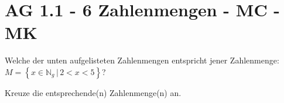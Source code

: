 \section{AG 1.1 - 6 Zahlenmengen - MC - MK}

\begin{beispiel}[AG 1.1]{1} %
				Welche der unten aufgelisteten Zahlenmengen entspricht jener Zahlenmenge: $M=\left\{x\in\mathbb{N}_{g}\,|\,2<x<5\right\}$?
				
				Kreuze die entsprechende(n) Zahlenmenge(n) an.\\
				
\end{beispiel}